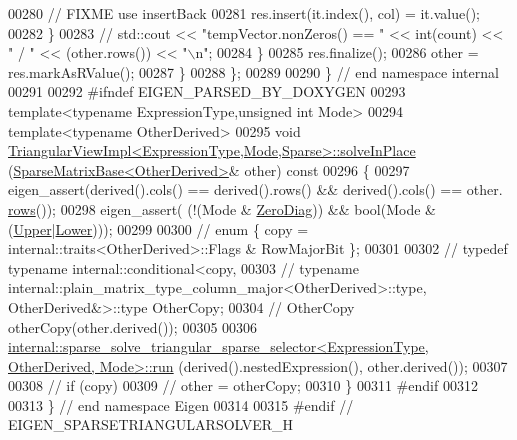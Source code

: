 \begin{DoxyCode}
00280         \textcolor{comment}{// FIXME use insertBack}
00281         res.insert(it.index(), col) = it.value();
00282       \}
00283 \textcolor{comment}{//       std::cout << "tempVector.nonZeros() == " << int(count) << " / " << (other.rows()) << "\(\backslash\)n";}
00284     \}
00285     res.finalize();
00286     other = res.markAsRValue();
00287   \}
00288 \};
00289 
00290 \} \textcolor{comment}{// end namespace internal}
00291 
00292 \textcolor{preprocessor}{#ifndef EIGEN\_PARSED\_BY\_DOXYGEN}
00293 \textcolor{keyword}{template}<\textcolor{keyword}{typename} ExpressionType,\textcolor{keywordtype}{unsigned} \textcolor{keywordtype}{int} Mode>
00294 \textcolor{keyword}{template}<\textcolor{keyword}{typename} OtherDerived>
00295 \textcolor{keywordtype}{void} \hyperlink{class_eigen_1_1_triangular_view_impl}{TriangularViewImpl<ExpressionType,Mode,Sparse>::solveInPlace}
      (\hyperlink{group___sparse_core___module_class_eigen_1_1_sparse_matrix_base}{SparseMatrixBase<OtherDerived>}& other)\textcolor{keyword}{ const}
00296 \textcolor{keyword}{}\{
00297   eigen\_assert(derived().cols() == derived().rows() && derived().cols() == other.
      \hyperlink{group___sparse_core___module_a1944e9fa9ce7937bfc3a87b2cb94371f}{rows}());
00298   eigen\_assert( (!(Mode & \hyperlink{group__enums_gga39e3366ff5554d731e7dc8bb642f83cda884ff7240392e85aa6e4b3c957e36483}{ZeroDiag})) && \textcolor{keywordtype}{bool}(Mode & (\hyperlink{group__enums_gga39e3366ff5554d731e7dc8bb642f83cda6bcb58be3b8b8ec84859ce0c5ac0aaec}{Upper}|\hyperlink{group__enums_gga39e3366ff5554d731e7dc8bb642f83cda891792b8ed394f7607ab16dd716f60e6}{Lower})));
00299 
00300 \textcolor{comment}{//   enum \{ copy = internal::traits<OtherDerived>::Flags & RowMajorBit \};}
00301 
00302 \textcolor{comment}{//   typedef typename internal::conditional<copy,}
00303 \textcolor{comment}{//     typename internal::plain\_matrix\_type\_column\_major<OtherDerived>::type, OtherDerived&>::type
       OtherCopy;}
00304 \textcolor{comment}{//   OtherCopy otherCopy(other.derived());}
00305 
00306   
      \hyperlink{struct_eigen_1_1internal_1_1sparse__solve__triangular__sparse__selector}{internal::sparse\_solve\_triangular\_sparse\_selector<ExpressionType, OtherDerived, Mode>::run}
      (derived().nestedExpression(), other.derived());
00307 
00308 \textcolor{comment}{//   if (copy)}
00309 \textcolor{comment}{//     other = otherCopy;}
00310 \}
00311 \textcolor{preprocessor}{#endif}
00312 
00313 \} \textcolor{comment}{// end namespace Eigen}
00314 
00315 \textcolor{preprocessor}{#endif // EIGEN\_SPARSETRIANGULARSOLVER\_H}
\end{DoxyCode}
